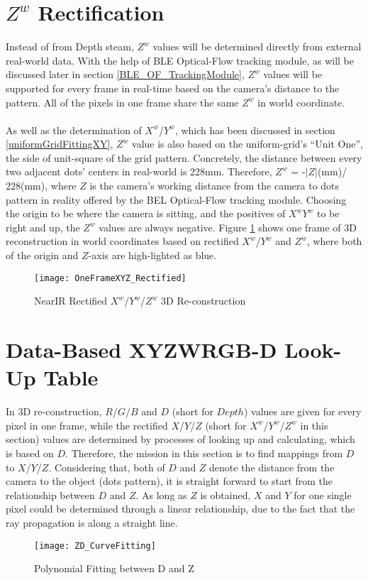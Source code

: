 \section{\(Z^{w}\) Rectification}
%
Instead of from Depth steam, \(Z^{w}\) values will be determined directly from external real-world data. With the help of BLE Optical-Flow tracking module, as will be discussed later in section \ref{BLE_OF_TrackingModule}, \(Z^{w}\) values will be supported for every frame in real-time based on the camera's distance to the pattern. All of the pixels in one frame share the same \(Z^{w}\) in world coordinate.%
\\\\%
As well as the determination of \(X^{w}\)/\(Y^{w}\), which has been discussed in section \ref{uniformGridFittingXY},  \(Z^{w}\) value is also based on the uniform-grid's \enquote{Unit One},  the side of unit-square of the grid pattern. Concretely, the distance between every two adjacent dots' centers in real-world is 228mm. Therefore, \(Z^{w}\) = -\(|Z|\)(mm)/ 228(mm), where \(Z\) is the camera's working distance from the camera to dots pattern in reality offered by the BEL Optical-Flow tracking module. Choosing the origin to be where the camera is sitting, and the positives of \(X^{w}\)\(Y^{w}\) to be right and up, the \(Z^{w}\) values are always negative. Figure \ref{OneFrameXYZ_Rectified} shows one frame of 3D reconstruction in world coordinates based on rectified \(X^{w}\)/\(Y^{w}\) and \(Z^{w}\), where both of the origin and \(Z\)-axis are high-lighted as blue.%
%
\begin{figure}[h]
\centering
\texttt{[image: OneFrameXYZ\_Rectified]}
\caption{NearIR Rectified \(X^{w}\)/\(Y^{w}\)/\(Z^{w}\) 3D Re-construction}
\label{OneFrameXYZ_Rectified}
\end{figure}%
%
\section{Data-Based XYZWRGB-D Look-Up Table}
In 3D re-construction, \(R\)/\(G\)/\(B\) and \(D\) (short for \(Depth\)) values are given for every pixel in one frame, while the rectified \(X\)/\(Y\)/\(Z\) (short for \(X^{w}\)/\(Y^{w}\)/\(Z^{w}\) in this section) values are determined by processes of looking up and calculating, which is based on \(D\). Therefore, the mission in this section is to find mappings from \(D\) to \(X\)/\(Y\)/\(Z\). Considering that, both of \(D\) and \(Z\) denote the distance from the camera to the object (dots pattern), it is straight forward to start from the relationship between \(D\) and \(Z\). As long as \(Z\) is obtained, \(X\) and \(Y\) for one single pixel could be determined through a linear relationship, due to the fact that the ray propagation is along a straight line.\\%
%
\begin{figure}[h]
\centering
\texttt{[image: ZD\_CurveFitting]}
\caption{Polynomial Fitting between D and Z}
\label{ZD_CurveFitting}
\end{figure}%
%
%
